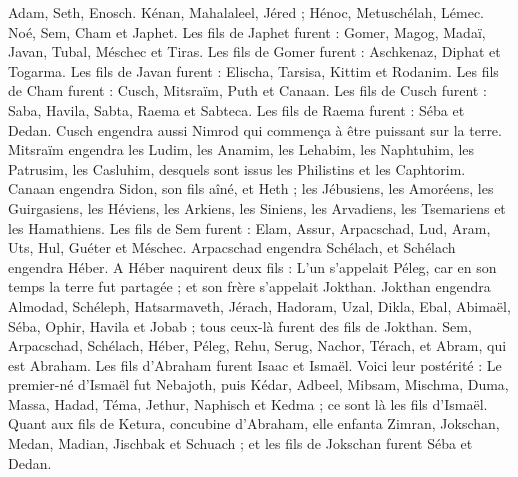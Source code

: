 \begin{multicols}{2}
\VerseOne{}Adam, Seth, Enosch.
Kénan, Mahalaleel, Jéred ;
Hénoc, Metuschélah, Lémec.
Noé, Sem, Cham et Japhet.
Les fils de Japhet furent : Gomer, Magog, Madaï, Javan, Tubal, Méschec et Tiras.
Les fils de Gomer furent : Aschkenaz, Diphat et Togarma.
Les fils de Javan furent : Elischa, Tarsisa, Kittim et Rodanim.
Les fils de Cham furent : Cusch, Mitsraïm, Puth et Canaan.
Les fils de Cusch furent : Saba, Havila, Sabta, Raema et Sabteca. Les fils de Raema furent : Séba et Dedan.
Cusch engendra aussi Nimrod qui commença à être puissant sur la terre.
Mitsraïm engendra les Ludim, les Anamim, les Lehabim, les Naphtuhim,
les Patrusim, les Casluhim, desquels sont issus les Philistins et les Caphtorim.
Canaan engendra Sidon, son fils aîné, et Heth ;
les Jébusiens, les Amoréens, les Guirgasiens,
les Héviens, les Arkiens, les Siniens,
les Arvadiens, les Tsemariens et les Hamathiens.
Les fils de Sem furent : Elam, Assur, Arpacschad, Lud, Aram, Uts, Hul, Guéter et Méschec.
Arpacschad engendra Schélach, et Schélach engendra Héber.
A Héber naquirent deux fils : L'un s'appelait Péleg, car en son temps la terre fut partagée ; et son frère s'appelait Jokthan.
Jokthan engendra Almodad, Schéleph, Hatsarmaveth, Jérach,
Hadoram, Uzal, Dikla,
Ebal, Abimaël, Séba,
Ophir, Havila et Jobab ; tous ceux-là furent des fils de Jokthan.
Sem, Arpacschad, Schélach,
Héber, Péleg, Rehu,
Serug, Nachor, Térach,
et Abram, qui est Abraham.
Les fils d'Abraham furent Isaac et Ismaël.
Voici leur postérité : Le premier-né d'Ismaël fut Nebajoth, puis Kédar, Adbeel, Mibsam,
Mischma, Duma, Massa, Hadad, Téma,
Jethur, Naphisch et Kedma ; ce sont là les fils d'Ismaël.
Quant aux fils de Ketura, concubine d'Abraham, elle enfanta Zimran, Jokschan, Medan, Madian, Jischbak et Schuach ; et les fils de Jokschan furent Séba et Dedan.

\end{multicols}
